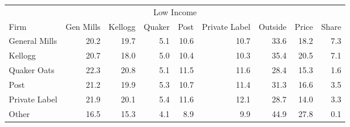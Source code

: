 \begin{tabular}{l rrrr rrrr}

\toprule
\multicolumn{9}{c}{Low Income}\\
          Firm &  Gen Mills &  Kellogg &  Quaker &  Post &  Private Label &  Outside &  Price &  Share \\
\midrule
 General Mills &       20.2 &     19.7 &     5.1 &  10.6 &           10.7 &     33.6 &   18.2 &    7.3 \\
       Kellogg &       20.7 &     18.0 &     5.0 &  10.4 &           10.3 &     35.4 &   20.5 &    7.1 \\
   Quaker Oats &       22.3 &     20.8 &     5.1 &  11.5 &           11.6 &     28.4 &   15.3 &    1.6 \\
          Post &       21.2 &     19.9 &     5.3 &  10.7 &           11.4 &     31.3 &   16.6 &    3.5 \\
 Private Label &       21.9 &     20.1 &     5.4 &  11.6 &           12.1 &     28.7 &   14.0 &    3.3 \\
         Other &       16.5 &     15.3 &     4.1 &   8.9 &            9.9 &     44.9 &   27.8 &    0.1 \\
\bottomrule
\end{tabular}

